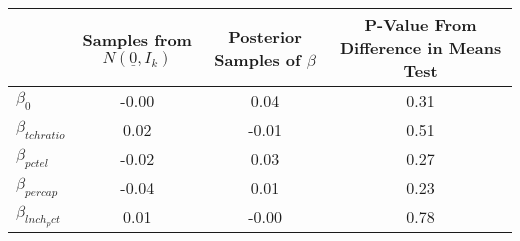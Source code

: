 \begin{tabular}{lccc}
\toprule
 & Samples from $N(\underline{0}, I_k)$ & Posterior Samples of $\beta$ & P-Value From Difference in Means Test \\
\midrule
$\beta_{0}$ & -0.00 & 0.04 & 0.31 \\
$\beta_{tchratio}$ & 0.02 & -0.01 & 0.51 \\
$\beta_{pctel}$ & -0.02 & 0.03 & 0.27 \\
$\beta_{percap}$ & -0.04 & 0.01 & 0.23 \\
$\beta_{lnch_pct}$ & 0.01 & -0.00 & 0.78 \\
\bottomrule
\end{tabular}
